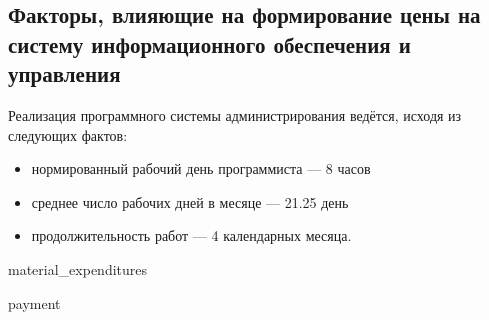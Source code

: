 \subsection{Факторы, влияющие на формирование цены на систему информационного обеспечения и управления}
Реализация программного системы администрирования ведётся, исходя из следующих фактов:
\begin{itemize}
\item нормированный рабочий день программиста --– 8 часов
\item среднее число рабочих дней в месяце –-- 21.25 день
\item продолжительность работ --- 4 календарных месяца.
\end{itemize}

{material_expenditures}

{payment}

